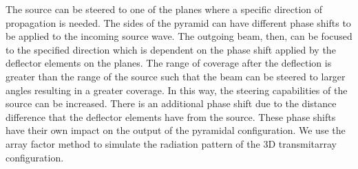 \documentclass[titlepage]{article}
\begin{document}
\newline
The source can be steered to one of the planes where a specific direction of propagation is needed. The sides of the pyramid can have different phase shifts to be applied to the incoming source wave. The outgoing beam, then, can be focused to the specified direction which is dependent on the phase shift applied by the deflector elements on the planes.  The range of coverage after the deflection is greater than the range of the source such that the beam can be steered to larger angles resulting in a greater coverage. In this way, the steering capabilities of the source can be increased. There is an additional phase shift due to the distance difference that the deflector elements have from the source. These phase shifts have their own impact on the output of the pyramidal configuration. We use the array factor method to simulate the radiation pattern of the 3D transmitarray configuration.
\end{document}
